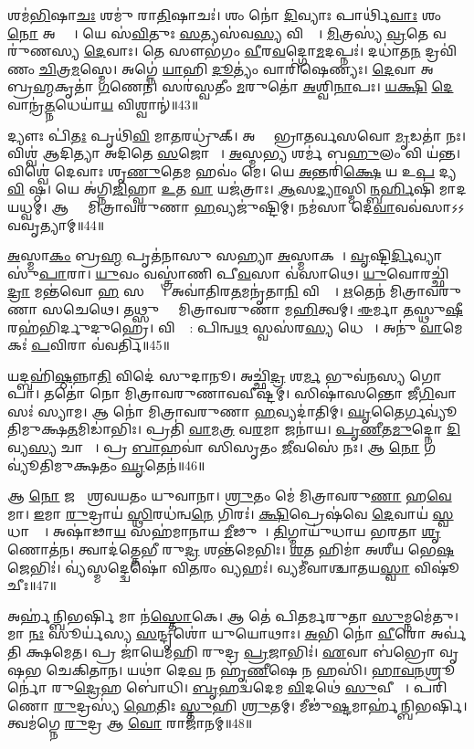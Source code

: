 𑌶𑌮॑\ul{𑌭𑌿}𑌷𑌾\ul{𑌚𑌃} 𑌶𑌮𑍁॑ 𑌰𑌾\ul{𑌤𑌿}𑌷𑌾𑌚𑌃॑।
𑌶𑌂 𑌨𑍋॑ \ul{𑌦𑌿}𑌵𑍍𑌯𑌾𑌃 𑌪𑌾𑌰𑍍𑌥𑌿॑\ul{𑌵𑌾𑌃} 𑌶𑌂 \ul{𑌨𑍋} 𑌅𑌪𑍍𑌯𑌾𑌃᳚।
𑌯𑍇 𑌸॑\ul{𑌵𑌿}𑌤𑍁𑌃 \ul{𑌸}𑌤𑍍𑌯𑌸॑𑌵\ul{𑌸𑍍𑌯} 𑌵𑌿𑌶𑍍𑌵𑍇᳚।
\ul{𑌮𑌿}𑌤𑍍𑌰𑌸𑍍𑌯॑ \ul{𑌵𑍍𑌰}𑌤𑍇 𑌵𑌰𑍁॑𑌣𑌸𑍍𑌯 \ul{𑌦𑍇}𑌵𑌾𑌃।
𑌤𑍇 𑌸𑍗𑌭॑𑌗𑌂 \ul{𑌵𑍀}𑌰\ul{𑌵}𑌦𑍍𑌗𑍋\ul{𑌮}𑌦𑌪𑍍𑌨𑌃॑।
𑌦𑌧𑌾॑𑌤\ul{𑌨} 𑌦𑍍𑌰𑌵𑌿॑𑌣𑌂 \ul{𑌚𑌿}𑌤𑍍𑌰\ul{𑌮}𑌸𑍍𑌮𑍇।
𑌅𑌗𑍍𑌨𑍇॑ \ul{𑌯𑌾}𑌹𑌿 \ul{𑌦𑍂}𑌤𑍍𑌯𑌂॑ 𑌵𑌾𑌰𑌿॑𑌷𑍇𑌣𑍍𑌯𑌃।
\ul{𑌦𑍇}𑌵𑌾 𑌅𑌚𑍍𑌛𑌾᳚ 𑌬𑍍𑌰\ul{𑌹𑍍𑌮}𑌕𑍃𑌤𑌾॑ \ul{𑌗}𑌣𑍇𑌨॑।
𑌸𑌰॑𑌸𑍍𑌵𑌤𑍀𑌂 \ul{𑌮}𑌰𑍁𑌤𑍋॑ \ul{𑌅}𑌶𑍍𑌵𑌿\ul{𑌨𑌾}𑌪𑌃।
\ul{𑌯}\ul{𑌕𑍍𑌷𑌿} \ul{𑌦𑍇}𑌵𑌾𑌨𑍍𑌰॑\ul{𑌤𑍍𑌨}𑌧𑍇𑌯𑌾॑\ul{𑌯} 𑌵𑌿𑌶𑍍𑌵𑌾𑌨𑍍॑॥43॥

𑌦𑍍𑌯𑍗𑌃 𑌪𑌿॑\ul{𑌤𑌃} 𑌪𑍃𑌥𑌿॑\ul{𑌵𑌿} 𑌮𑌾\ul{𑌤}𑌰𑌧𑍍𑌰𑍁॑𑌕𑍍।
𑌅𑌗𑍍𑌨𑍇᳚ 𑌭𑍍𑌰𑌾𑌤𑌰𑍍𑌵𑌸𑌵𑍋 \ul{𑌮𑍃}𑌡𑌤𑌾॑ 𑌨𑌃।
𑌵𑌿𑌶𑍍𑌵॑ 𑌆𑌦𑌿𑌤𑍍𑌯𑌾 𑌅𑌦𑌿𑌤𑍇 \ul{𑌸}𑌜𑍋𑌷𑌾𑌃᳚।
\ul{𑌅}𑌸𑍍𑌮\ul{𑌭𑍍𑌯}\ul{} 𑌶𑌰𑍍𑌮॑ 𑌬\ul{𑌹𑍁}𑌲𑌂 𑌵𑌿 𑌯॑𑌨𑍍𑌤।
𑌵𑌿𑌶𑍍𑌵𑍇॑ 𑌦𑍇𑌵𑌾𑌃 𑌶𑍃\ul{𑌣𑍁}𑌤𑍇𑌮 𑌹𑌵𑌂॑ 𑌮𑍇।
𑌯𑍇 \ul{𑌅}𑌨𑍍𑌤𑌰𑌿॑\ul{𑌕𑍍𑌷𑍇} 𑌯 𑌉\ul{𑌪} 𑌦𑍍𑌯\ul{𑌵𑌿} 𑌷𑍍𑌠।
𑌯𑍇 𑌅॑𑌗𑍍𑌨𑌿\ul{𑌜𑌿}𑌹𑍍𑌵𑌾 \ul{𑌉}𑌤 \ul{𑌵𑌾} 𑌯𑌜॑𑌤𑍍𑌰𑌾𑌃।
\ul{𑌆}𑌸\ul{𑌦𑍍𑌯𑌾}𑌸𑍍𑌮𑌿\ul{𑌨𑍍𑌬}\ul{𑌰𑍍}𑌹𑌿𑌷𑌿॑ 𑌮𑌾𑌦𑌯𑌧𑍍𑌵𑌮𑍍।
𑌆 𑌵𑌾𑌂᳚ 𑌮𑌿𑌤𑍍𑌰𑌾𑌵𑌰𑍁𑌣𑌾 \ul{𑌹}𑌵𑍍𑌯𑌜𑍁॑𑌷𑍍𑌟𑌿𑌮𑍍।
𑌨𑌮॑𑌸𑌾 𑌦𑍇\ul{𑌵𑌾}𑌵𑌵॑𑌸𑌾𑌽𑌽𑌵𑌵𑍃𑌤𑍍𑌯𑌾𑌮𑍍॥44॥

\ul{𑌅}𑌸𑍍𑌮𑌾\ul{𑌕𑌂} 𑌬𑍍𑌰\ul{𑌹𑍍𑌮} 𑌪𑍃𑌤॑𑌨𑌾𑌸𑍁 𑌸𑌹𑍍𑌯𑌾 \ul{𑌅}𑌸𑍍𑌮𑌾𑌕𑌮𑍍᳚।
\ul{𑌵𑍃}𑌷𑍍𑌟𑌿\ul{𑌰𑍍𑌦𑌿}𑌵𑍍𑌯𑌾 𑌸𑍁॑\ul{𑌪𑌾}𑌰𑌾।
\ul{𑌯𑍁}𑌵𑌂 𑌵𑌸𑍍𑌤𑍍𑌰𑌾॑𑌣𑌿 𑌪𑍀\ul{𑌵}𑌸𑌾 𑌵॑𑌸𑌾𑌥𑍇।
\ul{𑌯𑍁}𑌵𑍋𑌰𑌚𑍍𑌛𑌿॑\ul{𑌦𑍍𑌰𑌾} 𑌮𑌨𑍍𑌤॑𑌵𑍋 \ul{𑌹} 𑌸𑌰𑍍𑌗𑌾𑌃᳚।
𑌅𑌵𑌾॑𑌤𑌿𑌰\ul{𑌤}𑌮𑌨𑍃॑𑌤𑌾\ul{𑌨𑌿} 𑌵𑌿𑌶𑍍𑌵𑌾᳚।
\ul{𑌋}𑌤𑍇𑌨॑ 𑌮𑌿𑌤𑍍𑌰𑌾𑌵𑌰𑍁𑌣𑌾 𑌸𑌚𑍇𑌥𑍇।
𑌤𑌥𑍍𑌸𑍁 𑌵𑌾𑌂᳚ 𑌮𑌿𑌤𑍍𑌰𑌾𑌵𑌰𑍁𑌣𑌾 𑌮\ul{𑌹𑌿}𑌤𑍍𑌵𑌮𑍍।
\ul{𑌈}𑌰𑍍𑌮𑌾 \ul{𑌤}𑌸𑍍𑌥𑍁\ul{𑌷𑍀}𑌰𑌹॑𑌭𑌿𑌰𑍍𑌦𑍁𑌦𑍁𑌹𑍍𑌰𑍇।
𑌵𑌿𑌶𑍍𑌵𑌾᳚: 𑌪𑌿𑌨𑍍𑌵\ul{𑌥} 𑌸𑍍𑌵𑌸॑𑌰\ul{𑌸𑍍𑌯} 𑌧𑍇𑌨𑌾𑌃᳚।
𑌅𑌨𑍁॑ \ul{𑌵𑌾}𑌮𑍇𑌕𑌃॑ \ul{𑌪}𑌵𑌿𑌰𑌾 𑌵॑𑌵𑌰𑍍𑌤𑌿॥45॥

𑌯𑌦𑍍𑌬𑌹𑌿॑\ul{𑌷𑍍𑌠}𑌨𑍍𑌨𑌾\ul{𑌤𑌿} 𑌵𑌿𑌦𑍇॑ 𑌸𑍁𑌦𑌾𑌨𑍂।
𑌅𑌚𑍍𑌛𑌿॑\ul{𑌦𑍍𑌰}\ul{} 𑌶\ul{𑌰𑍍𑌮} 𑌭𑍁𑌵॑𑌨𑌸𑍍𑌯 𑌗𑍋𑌪𑌾।
𑌤𑌤𑍋॑ 𑌨𑍋 𑌮𑌿𑌤𑍍𑌰𑌾𑌵𑌰𑍁𑌣𑌾𑌵𑌵𑍀𑌷𑍍𑌟𑌮𑍍।
𑌸𑌿𑌷𑌾॑𑌸𑌨𑍍𑌤𑍋 𑌜𑍀\ul{𑌗𑌿}𑌵𑌾𑌸𑌃॑ 𑌸𑍍𑌯𑌾𑌮।
𑌆 𑌨𑍋॑ 𑌮𑌿𑌤𑍍𑌰𑌾𑌵𑌰𑍁𑌣𑌾 \ul{𑌹}𑌵𑍍𑌯𑌦𑌾॑𑌤𑌿𑌮𑍍।
\ul{𑌘𑍃}𑌤𑍈𑌰𑍍𑌗𑌵𑍍𑌯𑍂॑𑌤𑌿𑌮𑍁𑌕𑍍𑌷\ul{𑌤}𑌮𑌿𑌡𑌾॑𑌭𑌿𑌃।
𑌪𑍍𑌰𑌤𑌿॑ \ul{𑌵𑌾}𑌮\ul{𑌤𑍍𑌰} 𑌵\ul{𑌰}𑌮𑌾 𑌜𑌨𑌾॑𑌯।
\ul{𑌪𑍃}\ul{𑌣𑍀}𑌤\ul{𑌮𑍁}𑌦𑍍𑌨𑍋 \ul{𑌦𑌿}𑌵𑍍𑌯\ul{𑌸𑍍𑌯} 𑌚𑌾𑌰𑍋𑌃᳚।
𑌪𑍍𑌰 \ul{𑌬𑌾}𑌹𑌵𑌾॑ 𑌸𑌿𑌸𑍃𑌤𑌂 \ul{𑌜𑍀}𑌵𑌸𑍇॑ 𑌨𑌃।
𑌆 \ul{𑌨𑍋} 𑌗𑌵𑍍𑌯𑍂॑𑌤𑌿𑌮𑍁𑌕𑍍𑌷𑌤𑌂 \ul{𑌘𑍃}𑌤𑍇𑌨॑॥46॥

𑌆 \ul{𑌨𑍋} 𑌜𑌨𑍇᳚ 𑌶𑍍𑌰𑌵𑌯𑌤𑌂 𑌯𑍁𑌵𑌾𑌨𑌾।
\ul{𑌶𑍍𑌰𑍁}𑌤𑌂 𑌮𑍇॑ 𑌮𑌿𑌤𑍍𑌰𑌾𑌵𑌰𑍁\ul{𑌣𑌾} 𑌹\ul{𑌵𑍇}𑌮𑌾।
\ul{𑌇}𑌮𑌾 \ul{𑌰𑍁}𑌦𑍍𑌰𑌾𑌯॑ \ul{𑌸𑍍𑌥𑌿}𑌰𑌧॑𑌨𑍍𑌵\ul{𑌨𑍇} 𑌗𑌿𑌰𑌃॑।
\ul{𑌕𑍍𑌷𑌿}𑌪𑍍𑌰𑍇𑌷॑𑌵𑍇 \ul{𑌦𑍇}𑌵𑌾𑌯॑ \ul{𑌸𑍍𑌵}𑌧𑌾𑌮𑍍𑌨𑍇᳚।
𑌅𑌷𑌾॑𑌢𑌾\ul{𑌯} 𑌸𑌹॑𑌮𑌾𑌨𑌾𑌯 \ul{𑌮𑍀}𑌢𑍁𑌷𑍇᳚।
\ul{𑌤𑌿}𑌗𑍍𑌮𑌾𑌯𑍁॑𑌧𑌾𑌯 𑌭𑌰𑌤𑌾 \ul{𑌶𑍃}𑌣𑍋𑌤॑𑌨।
𑌤𑍍𑌵𑌾𑌦॑𑌤𑍍𑌤𑍇𑌭𑍀 𑌰𑍁\ul{𑌦𑍍𑌰} 𑌶𑌨𑍍𑌤॑𑌮𑍇𑌭𑌿𑌃।
\ul{𑌶}𑌤 𑌹𑌿𑌮𑌾॑ 𑌅𑌶𑍀𑌯 𑌭𑍇\ul{𑌷}𑌜𑍇𑌭𑌿𑌃॑।
𑌵𑍍𑌯॑𑌸𑍍𑌮𑌦𑍍𑌦𑍍𑌵𑍇𑌷𑍋॑ 𑌵𑌿\ul{𑌤}𑌰𑌂 𑌵𑍍𑌯𑌹𑌃॑।
𑌵𑍍𑌯𑌮𑍀॑𑌵𑌾𑌶𑍍𑌚𑌾𑌤𑌯\ul{𑌸𑍍𑌵𑌾} 𑌵𑌿𑌷𑍂॑𑌚𑍀𑌃॥47॥

𑌅𑌰𑍍\mbox{}𑌹॑𑌨𑍍𑌬𑌿𑌭𑌰𑍍\mbox{}\ul{𑌷𑌿} 𑌮𑌾 𑌨॑\ul{𑌸𑍍𑌤𑍋}𑌕𑍇।
𑌆 𑌤𑍇॑ 𑌪𑌿𑌤𑌰𑍍𑌮𑌰𑍁𑌤𑌾 \ul{𑌸𑍁}𑌮𑍍𑌨𑌮𑍇॑𑌤𑍁।
𑌮𑌾 \ul{𑌨𑌃} 𑌸𑍂𑌰𑍍𑌯॑𑌸𑍍𑌯 \ul{𑌸}𑌨𑍍𑌦𑍃𑌶𑍋॑ 𑌯𑍁𑌯𑍋𑌥𑌾𑌃।
\ul{𑌅}𑌭𑌿 𑌨𑍋॑ \ul{𑌵𑍀}𑌰𑍋 𑌅𑌰𑍍𑌵॑𑌤𑌿 𑌕𑍍𑌷𑌮𑍇𑌤।
𑌪𑍍𑌰 𑌜𑌾॑𑌯𑍇𑌮𑌹𑌿 𑌰𑍁𑌦𑍍𑌰 \ul{𑌪𑍍𑌰}𑌜𑌾𑌭𑌿𑌃॑।
\ul{𑌏}𑌵𑌾 𑌬॑𑌭𑍍𑌰𑍋 𑌵𑍃𑌷𑌭 𑌚𑍇𑌕𑌿𑌤𑌾𑌨।
𑌯𑌥𑌾॑ 𑌦𑍇\ul{𑌵} 𑌨 𑌹𑍃॑\ul{𑌣𑍀}𑌷𑍇 𑌨 𑌹𑌸𑌿॑।
\ul{𑌹𑌾}\ul{𑌵}\ul{𑌨}𑌶𑍍𑌰𑍂𑌰𑍍𑌨𑍋॑ 𑌰𑍁\ul{𑌦𑍍𑌰𑍇}𑌹 𑌬𑍋॑𑌧𑌿।
\ul{𑌬𑍃}𑌹𑌦𑍍𑌵॑𑌦𑍇𑌮 \ul{𑌵𑌿}𑌦𑌥𑍇॑ \ul{𑌸𑍁}𑌵𑍀𑌰𑌾𑌃᳚।
𑌪𑌰𑌿॑ 𑌣𑍋 \ul{𑌰𑍁}𑌦𑍍𑌰𑌸𑍍𑌯॑ \ul{𑌹𑍇}𑌤𑌿𑌃 \ul{𑌸𑍍𑌤𑍁}𑌹𑌿 \ul{𑌶𑍍𑌰𑍁}𑌤𑌮𑍍।
𑌮𑍀𑌢𑍁॑\ul{𑌷𑍍𑌟}𑌮𑌾𑌰𑍍\mbox{}𑌹॑𑌨𑍍𑌬𑌿𑌭𑌰𑍍\mbox{}𑌷𑌿।
𑌤𑍍𑌵𑌮॑𑌗𑍍𑌨𑍇 \ul{𑌰𑍁}𑌦𑍍𑌰 𑌆 \ul{𑌵𑍋} 𑌰𑌾𑌜𑌾॑𑌨𑌮𑍍॥48॥\anuvakamend[𑌵𑌸𑍂॑𑌨𑌿 𑌤𑌤𑌾𑌨𑌾\ul{𑌸𑍍𑌤𑍁} 𑌵𑌿𑌶𑍍𑌵𑌾𑌨𑍍॑ 𑌵𑌵𑍃𑌤𑍍𑌯𑌾𑌂 𑌵𑌵𑌰𑍍𑌤𑌿 \ul{𑌘𑍃}𑌤𑍇\ul{𑌨} 𑌵𑌿𑌷𑍂॑𑌚𑍀𑌃 \ul{𑌶𑍍𑌰𑍁}𑌤𑌨𑍍𑌦𑍍𑌵𑍇 𑌚॑]

